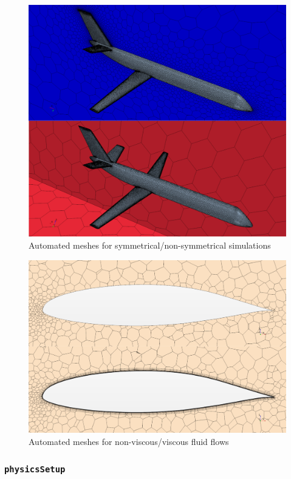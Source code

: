 \begin{figure}[H]
\centering
\includegraphics[scale=0.60]{Immagini/Capitolo4/symmetry}
\caption{Automated meshes for symmetrical/non-symmetrical simulations}
\label{fig:SymmMesh}
\end{figure} 
%
\begin{figure}[H]
\centering
\includegraphics[scale=0.60]{Immagini/Capitolo4/airfoil}
\caption{Automated meshes for non-viscous/viscous fluid flows}
\label{fig:AirfoilMesh}
\end{figure} 
%

\subsubsection{\texttt{physicsSetup}}


